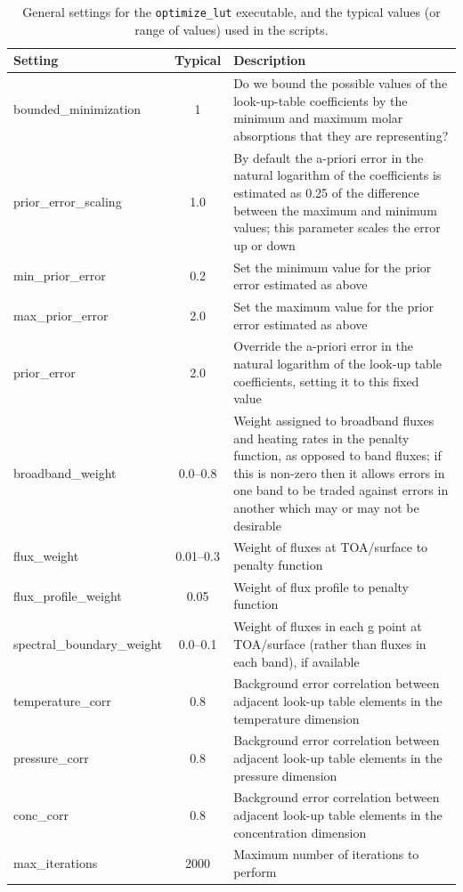 \documentclass[a4,oneside]{article}
\def\codesize{\small}
\def\codesize{\small}
\def\code#1{{\codesize\texttt{#1}}}
\begin{document}
\begin{table}[tb!]
\caption{\label{tab:optimize}General settings for the
  \code{optimize\_lut} executable, and the typical values (or range of
  values) used in the scripts.}
\begin{center}
\begin{tabular}{lc>{\raggedright\arraybackslash}p{9cm}}
\hline
Setting & Typical & Description\\
\hline
bounded\_minimization & 1 & Do we bound the possible values of the look-up-table coefficients by the minimum and maximum molar absorptions that they are representing? \\
prior\_error\_scaling & 1.0 & By default the a-priori error in the natural logarithm of the coefficients is estimated as 0.25 of the difference between the maximum and minimum values; this parameter scales the error up or down\\
min\_prior\_error & 0.2 & Set the minimum value for the prior error estimated as above\\
max\_prior\_error & 2.0 & Set the maximum value for the prior error estimated as above\\
prior\_error & 2.0 & Override the a-priori error in the natural logarithm of the look-up table coefficients, setting it to this fixed value \\
broadband\_weight & 0.0--0.8 & Weight assigned to broadband fluxes and heating rates in the penalty function, as opposed to band fluxes; if this is non-zero then it allows errors in one band to be traded against errors in another which may or may not be desirable\\
flux\_weight & 0.01--0.3 & Weight of fluxes at TOA/surface to penalty function\\
flux\_profile\_weight & 0.05 & Weight of flux profile to penalty function \\
spectral\_boundary\_weight & 0.0--0.1 & Weight of fluxes in each g point at TOA/surface (rather than fluxes in each band), if available\\
temperature\_corr & 0.8 & Background error correlation between adjacent look-up table elements in the temperature dimension\\
pressure\_corr & 0.8  & Background error correlation between adjacent look-up table elements in the pressure dimension\\
conc\_corr & 0.8  & Background error correlation between adjacent look-up table elements in the concentration dimension\\
max\_iterations & 2000 & Maximum number of iterations to perform \\

\end{tabular}
\end{center}
\end{table}
\end{document}
